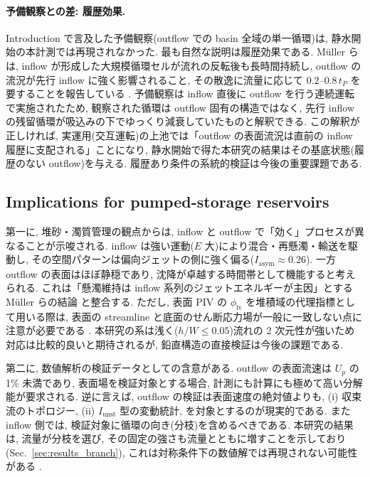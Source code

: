 \paragraph{予備観察との差: 履歴効果.}
Introduction で言及した予備観察(outflow での basin 全域の単一循環)は, 静水開始の本計測では再現されなかった. 最も自然な説明は履歴効果である. M\"uller らは, inflow が形成した大規模循環セルが流れの反転後も長時間持続し, outflow の流況が先行 inflow に強く影響されること, その散逸に流量に応じて $0.2$--$0.8\,t_P$ を要することを報告している \cite{mullerInfluenceOutflowSequences2012}. 予備観察は inflow 直後に outflow を行う連続運転で実施されたため, 観察された循環は outflow 固有の構造ではなく, 先行 inflow の残留循環が吸込みの下でゆっくり減衰していたものと解釈できる. この解釈が正しければ, 実運用(交互運転)の上池では「outflow の表面流況は直前の inflow 履歴に支配される」ことになり, 静水開始で得た本研究の結果はその基底状態(履歴のない outflow)を与える. 履歴あり条件の系統的検証は今後の重要課題である.

\subsection{Implications for pumped-storage reservoirs}
\label{sec:discussion_implications}

第一に, 堆砂・濁質管理の観点からは, inflow と outflow で「効く」プロセスが異なることが示唆される. inflow は強い運動($E$ 大)により混合・再懸濁・輸送を駆動し, その空間パターンは偏向ジェットの側に強く偏る($I_{\mathrm{asym}} \approx 0.26$). 一方 outflow の表面はほぼ静穏であり, 沈降が卓越する時間帯として機能すると考えられる. これは「懸濁維持は inflow 系列のジェットエネルギーが主因」とする M\"uller らの結論 \cite{mullerExperimentsEffectInflow2017} と整合する. ただし, 表面 PIV の $\phi_{\mathrm{lv}}$ を堆積域の代理指標として用いる際は, 表面の streamline と底面のせん断応力場が一般に一致しない点に注意が必要である \cite{constantinescuNumericalModelSimulation1998}. 本研究の系は浅く($h/W \le 0.05$)流れの 2 次元性が強いため対応は比較的良いと期待されるが, 鉛直構造の直接検証は今後の課題である.

第二に, 数値解析の検証データとしての含意がある. outflow の表面流速は $U_p$ の 1\% 未満であり, 表面場を検証対象とする場合, 計測にも計算にも極めて高い分解能が要求される. 逆に言えば, outflow の検証は表面速度の絶対値よりも, (i) 収束流のトポロジー, (ii) $I_{\mathrm{unst}}$ 型の変動統計, を対象とするのが現実的である. また inflow 側では, 検証対象に循環の向き(分枝)を含めるべきである. 本研究の結果は, 流量が分枝を選び, その固定の強さも流量とともに増すことを示しており(Sec.~\ref{sec:results_branch}), これは対称条件下の数値解では再現されない可能性がある \cite{kantoushFLOWSHALLOWRECTANGULAR2008,dufresneNumericalInvestigationFlow2011}.

